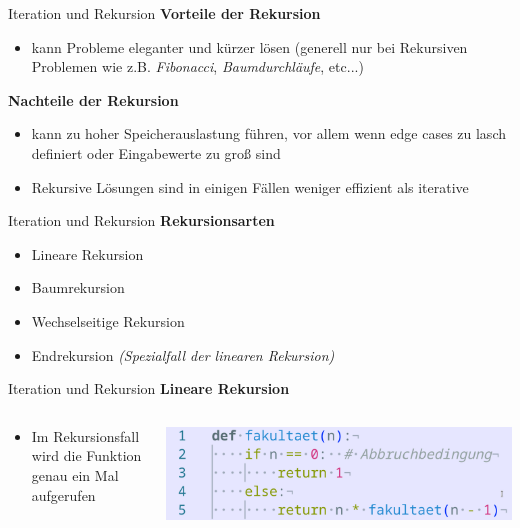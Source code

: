 \documentclass[aspectratio=169]{beamer}
\begin{document}
\begin{frame}{Iteration und Rekursion}
    \textbf{Vorteile der Rekursion}
    \begin{itemize}
        \item kann Probleme eleganter und kürzer lösen (generell nur bei Rekursiven Problemen wie z.B. \textit{Fibonacci}, \textit{Baumdurchläufe}, etc...)
    \end{itemize}
    \pause
    \textbf{Nachteile der Rekursion}
    \begin{itemize}
        \item kann zu hoher Speicherauslastung führen, vor allem wenn edge cases zu lasch definiert oder Eingabewerte zu groß sind
        \item Rekursive Lösungen sind in einigen Fällen weniger effizient als iterative
    \end{itemize}
\end{frame}

\begin{frame}{Iteration und Rekursion}
    \textbf{Rekursionsarten}
    \begin{itemize}
        \item Lineare Rekursion
        \item Baumrekursion
        \item Wechselseitige Rekursion
        \item Endrekursion \textit{(Spezialfall der linearen Rekursion)}
    \end{itemize}
\end{frame}

\begin{frame}{Iteration und Rekursion}
    \textbf{Lineare Rekursion}
    \begin{columns}
        \begin{column}{0.5\textwidth}
            \begin{itemize}
                \item Im Rekursionsfall wird die Funktion genau ein Mal aufgerufen
            \end{itemize}
        \end{column}
        \pause
        \begin{column}{0.5\textwidth}
            \begin{tcolorbox}[colframe=oxfordblue, colback=blue!10, coltitle=white, title=Python]
                \includegraphics[width=\textwidth]{images/code_recursionfacultyexample.png}
            \end{tcolorbox}
        \end{column}
    \end{columns}
\end{frame}
\end{document}
